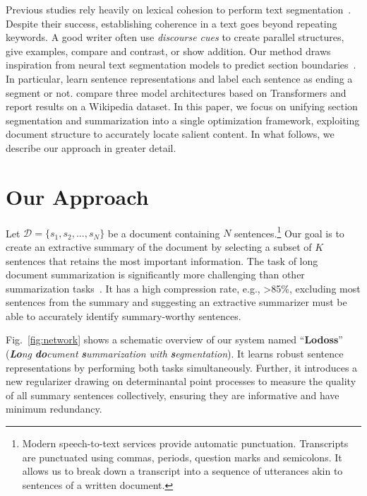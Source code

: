 \documentclass[11pt]{article}
\begin{document}
Previous studies rely heavily on lexical cohesion to perform text segmentation~\citep{hearst-1997-text,passonneau-litman-1997-discourse,malioutov-barzilay-2006-minimum}.
Despite their success, establishing coherence in a text goes beyond repeating keywords.
A good writer often use \emph{discourse cues} to create parallel structures, give examples, compare and contrast, or show addition. Our method draws inspiration from neural text segmentation models to predict section boundaries~\citep{koshorek-etal-2018-text,arnold-etal-2019-sector,xing-etal-2020-improving,lukasik-etal-2020-text}.
In particular, \citet{koshorek-etal-2018-text} learn sentence representations and label each sentence as ending a segment or not.
\citet{lukasik-etal-2020-text} compare three model architectures based on Transformers and report results on a Wikipedia dataset.
In this paper, we focus on unifying section segmentation and summarization into a single optimization framework, 
exploiting document structure to accurately locate salient content.
In what follows, we describe our approach in greater detail.




\section{Our Approach}
\label{sec:approach}



Let $\mathcal{D} = \{s_1, s_2, ..., s_N\}$ be a document containing $N$ sentences.\footnote{
Modern speech-to-text services provide automatic punctuation.
Transcripts are punctuated using commas, periods, question marks and semicolons. 
It allows us to break down a transcript into a sequence of utterances 
akin to sentences of a written document.
}
Our goal is to create an extractive summary of the document by selecting a subset of $K$ sentences that retains the most important information.
The task of long document summarization is significantly more challenging than other summarization tasks~\cite{daume-iii-marcu-2002-noisy}.
It has a high compression rate, e.g., >85\%,
excluding most sentences from the summary
and suggesting an extractive summarizer must be able to accurately identify summary-worthy sentences.


Fig.~\ref{fig:network} shows a schematic overview of our system named ``\textbf{Lodoss}'' (\textsl{\textbf{Lo}ng} \textsl{\textbf{do}cument} \textsl{\textbf{s}ummarization} \textsl{with} \textsl{\textbf{s}egmentation}).
It learns robust sentence representations by performing both tasks simultaneously.
Further, it introduces a new regularizer drawing on determinantal point processes \cite{cho-etal-2019-multi,DPPAttn:2021} to measure the quality of all summary sentences collectively, ensuring they are informative and have minimum redundancy. 
\end{document}
